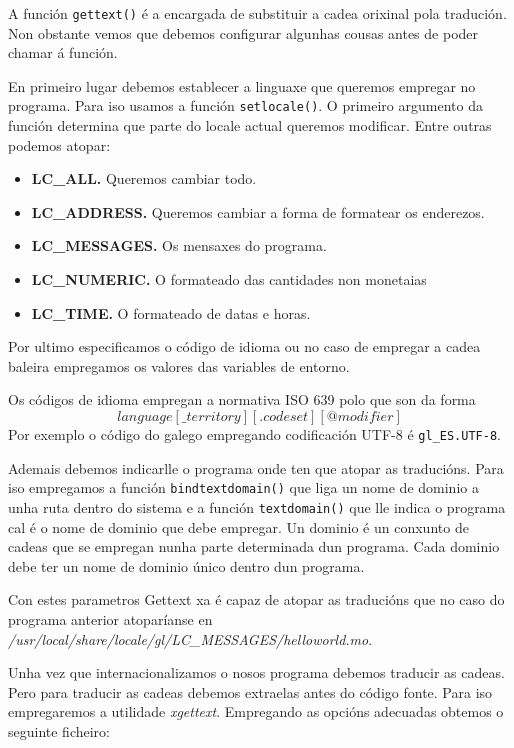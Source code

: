 A función \lstinline{gettext()} é a encargada de substituir a cadea orixinal pola tradución. Non obstante vemos que debemos configurar algunhas cousas antes de poder chamar á función.

En primeiro lugar debemos establecer a linguaxe que queremos empregar no programa. Para iso usamos a función \lstinline{setlocale()}. O primeiro argumento da función determina que parte do locale actual queremos modificar. Entre outras podemos atopar:

\begin{itemize}
    \item \textbf{LC\_ALL.} Queremos cambiar todo.
    \item \textbf{LC\_ADDRESS.} Queremos cambiar a forma de formatear os enderezos.
    \item \textbf{LC\_MESSAGES.} Os mensaxes do programa.
    \item \textbf{LC\_NUMERIC.} O formateado das cantidades non monetaias
    \item \textbf{LC\_TIME.} O formateado de datas e horas.
\end{itemize}

Por ultimo especificamos o código de idioma ou no caso de empregar a cadea baleira empregamos os valores das variables de entorno.

Os códigos de idioma empregan a normativa ISO 639 polo que son da forma $$language[\_territory][.codeset][@modifier]$$ Por exemplo o código do galego empregando codificación UTF-8 é \lstinline{gl_ES.UTF-8}.

Ademais debemos indicarlle o programa onde ten que atopar as traducións. Para iso empregamos a función \lstinline{bindtextdomain()} que liga un nome de dominio a unha ruta dentro do sistema e a función \lstinline{textdomain()} que lle indica o programa cal é o nome de dominio que debe empregar. Un dominio é un conxunto de cadeas que se empregan nunha parte determinada dun programa. Cada dominio debe ter un nome de dominio único dentro dun programa.

Con estes parametros Gettext xa é capaz de atopar as traducións que no caso do programa anterior atoparíanse en \emph{/usr/local/share/locale/gl/LC\_MESSAGES/helloworld.mo}.

Unha vez que internacionalizamos o nosos programa debemos traducir as cadeas. Pero para traducir as cadeas debemos extraelas antes do código fonte. Para iso empregaremos a utilidade \emph{xgettext}. Empregando as opcións adecuadas obtemos o seguinte ficheiro:

